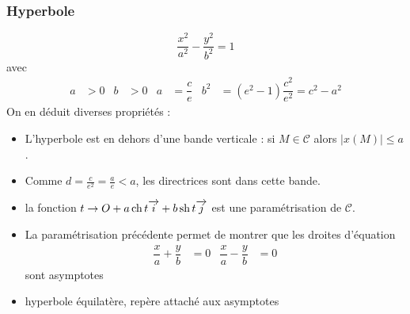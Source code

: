 \subsubsection{Hyperbole}
\begin{displaymath}
\dfrac{x^2}{a^2} - \dfrac{y^2}{b^2} = 1
\end{displaymath}
avec 
\begin{align*}
 a&>0 & b&>0 & a &= \dfrac{c}{e} & b^2 &= (e^2-1)\dfrac{c^2}{e^2}=c^2 - a^2
\end{align*}
On en déduit diverses propriétés :
\begin{itemize}
 \item L'hyperbole est en dehors d'une bande verticale : si $M\in \mathcal C$ alors $|x(M)|\leq a$.
\item Comme $d=\frac{c}{e^2}=\frac{a}{e}<a$, les directrices sont dans cette bande.
\item la fonction $t \rightarrow O +a\mathop{\mathrm{ch}} t \overrightarrow{i} + b\mathop{\mathrm{sh}} t \overrightarrow{j}$ est une paramétrisation de $\mathcal C$.
\item La paramétrisation précédente permet de montrer que les droites d'équation
\begin{align*}
 \dfrac{x}{a}+\dfrac{y}{b}&=0 & \dfrac{x}{a}-\dfrac{y}{b}&= 0
\end{align*}
sont asymptotes
\item hyperbole équilatère, repère attaché aux asymptotes
\end{itemize}
